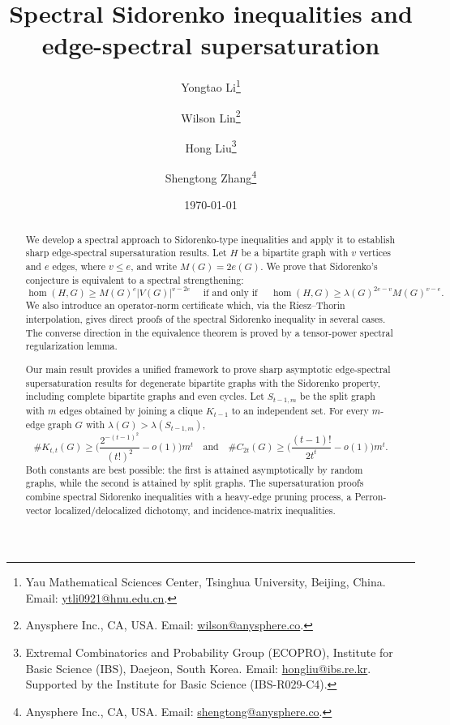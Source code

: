 \documentclass[11pt]{article}
\theoremstyle{definition}
\theoremstyle{plain}
\begin{document}
\title{Spectral Sidorenko inequalities and edge-spectral supersaturation}

\author{
Yongtao Li\thanks{Yau Mathematical Sciences Center, Tsinghua University, Beijing, China. Email: \url{ytli0921@hnu.edu.cn}.}
\and
Wilson Lin\thanks{Anysphere Inc., CA, USA. Email: \url{wilson@anysphere.co}.}
\and
Hong Liu\thanks{Extremal Combinatorics and Probability Group (ECOPRO), Institute for Basic Science (IBS), Daejeon, South Korea. Email: \url{hongliu@ibs.re.kr}. Supported by the Institute for Basic Science (IBS-R029-C4).}
\and
Shengtong Zhang\thanks{Anysphere Inc., CA, USA. Email: \url{shengtong@anysphere.co}.}
}

\date{\today}
\maketitle

\vspace{-0.5cm} 
\begin{abstract}
We develop a spectral approach to Sidorenko-type inequalities and apply
it to establish sharp edge-spectral supersaturation results.  Let \(H\) be a bipartite
graph with \(v\) vertices and \(e\) edges, where \(v\le e\), and write
\(M(G)=2e(G)\).  We prove that Sidorenko's conjecture is equivalent to a spectral
strengthening:
\[
        \hom(H,G)\ge M(G)^e |V(G)|^{v-2e} \quad \text{ if and only if }\quad \hom(H,G)\ge \lambda(G)^{2e-v}M(G)^{v-e}.
\]
We also introduce an operator-norm certificate which, via the 
Riesz--Thorin interpolation, gives direct proofs of the spectral
Sidorenko inequality in several cases.  The converse direction in the equivalence
theorem is proved by a tensor-power spectral regularization lemma.

{Our main result provides a unified framework to prove sharp asymptotic edge-spectral supersaturation results for degenerate bipartite graphs with the Sidorenko property, including complete bipartite graphs and even cycles.} 
Let $S_{t-1,m}$ be the split graph with $m$ edges 
obtained by joining a clique $K_{t-1}$ to an independent set. For every $m$-edge graph \(G\) with $\lambda(G)>\lambda(S_{t-1,m})$, 
$$\texttt{\#} K_{t,t}(G)
        \ge
        \Big(\frac{2^{-(t-1)^2}}{(t!)^2}-o(1)\Big)m^t \quad \text{and}\quad
 \texttt{\#}C_{2t}(G)
        \ge
        \Big(\frac{(t-1)!}{2t^t}-o(1)\Big)m^t.$$
Both constants are best possible: the first is attained asymptotically
by random graphs, while the second is
attained by split graphs.  The supersaturation proofs combine
spectral Sidorenko inequalities with a heavy-edge pruning process, a Perron-vector localized/delocalized dichotomy, and incidence-matrix inequalities.
\end{abstract}
\end{document}
